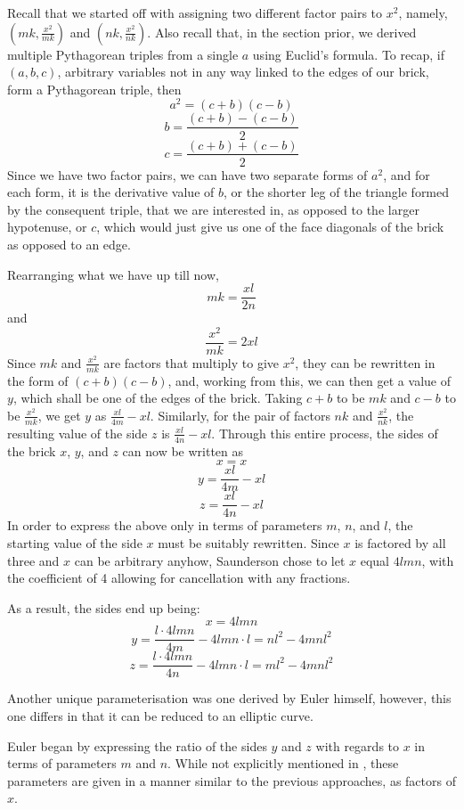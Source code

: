 \documentclass[11pt]{article}
\begin{document}
Recall that we started off with assigning two different factor pairs to $x^2$, namely, $(mk, \frac{x^2}{mk})$ and $(nk, \frac{x^2}{nk})$. Also recall that, in the section prior, we derived multiple Pythagorean triples from a single $a$ using Euclid's formula. To recap, if $(a, b, c)$, arbitrary variables not in any way linked to the edges of our brick, form a Pythagorean triple,
then 
$$a^2=(c+b)(c-b)$$
$$b=\frac{(c+b)-(c-b)}{2}$$
$$c=\frac{(c+b)+(c-b)}{2}$$
Since we have two factor pairs, we can have two separate forms of $a^2$, and for each form, it is the derivative value of $b$, or the shorter leg of the triangle formed by the consequent triple, that we are interested in, as opposed to the larger hypotenuse, or $c$, which would just give us one of the face diagonals of the brick as opposed to an edge.

Rearranging what we have up till now,
$$mk=\frac{xl}{2n}$$
and 
$$\frac{x^2}{mk}=2xl$$
Since $mk$ and $\frac{x^2}{mk}$ are factors that multiply to give $x^2$, they can be rewritten in the form of $(c+b)(c-b)$, and, working from this, we can then get a value of $y$, which shall be one of the edges of the brick. Taking $c+b$ to be $mk$ and $c-b$ to be $\frac{x^2}{mk}$, we get $y$ as $\frac{xl}{4m}-xl$. Similarly, for the pair of factors $nk$ and $\frac{x^2}{nk}$, the resulting value of the side $z$ is $\frac{xl}{4n}-xl$.
Through this entire process, the sides of the brick $x$, $y$, and $z$ can now be written as
$$x=x$$
$$y=\frac{xl}{4m}-xl$$
$$z=\frac{xl}{4n}-xl$$
In order to express the above only in terms of parameters $m$, $n$, and $l$, the starting value of the side $x$ must be suitably rewritten. Since $x$ is factored by all three and $x$ can be arbitrary anyhow, Saunderson chose to let $x$ equal $4lmn$, with the coefficient of 4 allowing for cancellation with any fractions.

As a result, the sides end up being:
$$x=4lmn$$
$$y=\frac{l\cdot{4lmn}}{4m}-4lmn\cdot{l}=nl^2-4mnl^2$$
$$z=\frac{l\cdot{4lmn}}{4n}-4lmn\cdot{l}=ml^2-4mnl^2$$

Another unique parameterisation was one derived by Euler himself, however, this one differs in that it can be reduced to an elliptic curve.

Euler began by expressing the ratio of the sides $y$ and $z$ with regards to $x$ in terms of parameters $m$ and $n$. While not explicitly mentioned in \cite{euler}, these parameters are given in a manner similar to the previous approaches, as factors of $x$.
\end{document}
